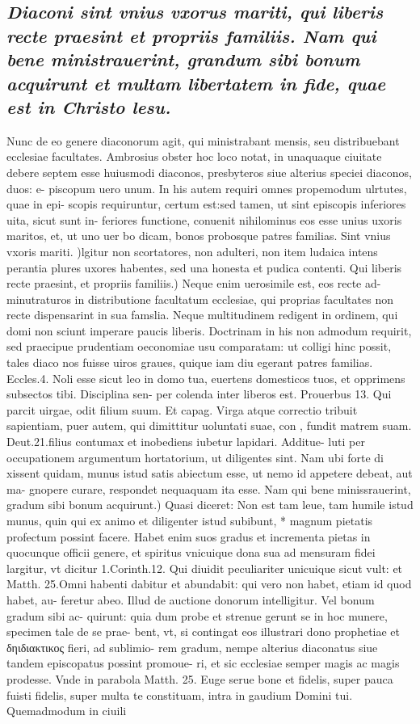 \documentclass{article}
\begin{document}
\begin{pages}
\subsection*{\textit{Diaconi sint vnius vxorus mariti, qui liberis recte praesint et propriis familiis. Nam qui bene ministrauerint, grandum sibi bonum acquirunt et multam libertatem in fide, quae est in Christo lesu. }}\pstart Nunc de eo genere diaconorum agit, qui ministrabant mensis, seu distribuebant ecclesiae facultates. Ambrosius obster hoc loco notat, in unaquaque ciuitate debere septem esse huiusmodi diaconos, presbyteros siue alterius speciei diaconos, duos: e- piscopum uero unum. In his autem requiri omnes propemodum ulrtutes, quae in epi- scopis requiruntur, certum est:sed tamen, ut sint episcopis inferiores uita, sicut sunt in- feriores functione, conuenit nihilominus eos esse unius uxoris maritos, et, ut uno uer bo dicam, bonos probosque patres familias.  \pend\pstart Sint vnius vxoris mariti. )lgitur non scortatores, non adulteri, non item ludaica intens perantia plures uxores habentes, sed una honesta et pudica contenti.  \pend\pstart Qui liberis recte praesint, et propriis familiis.) Neque enim uerosimile est, eos recte ad- minutraturos in distributione facultatum ecclesiae, qui proprias facultates non recte dispensarint in sua famslia. Neque multitudinem redigent in ordinem, qui domi non sciunt imperare paucis liberis. Doctrinam in his non admodum requirit, sed praecipue prudentiam oeconomiae usu comparatam: ut colligi hinc possit, tales diaco nos fuisse uiros graues, quique iam diu egerant patres familias. Eccles.4. Noli esse sicut leo in domo tua, euertens domesticos tuos, et opprimens subsectos tibi. Disciplina sen- per colenda inter liberos est. Prouerbus 13. Qui parcit uirgae, odit filium suum. Et capag. Virga atque correctio tribuit sapientiam, puer autem, qui dimittitur uoluntati suae, con , fundit matrem suam. Deut.21.filius contumax et inobediens iubetur lapidari. Additue- luti per occupationem argumentum hortatorium, ut diligentes sint. Nam ubi forte di xissent quidam, munus istud satis abiectum esse, ut nemo id appetere debeat, aut ma- gnopere curare, respondet nequaquam ita esse.  \pend\pstart Nam qui bene minissrauerint, gradum sibi bonum acquirunt.) Quasi diceret: Non  est tam leue, tam humile istud munus, quin qui ex animo et diligenter istud subibunt, * magnum pietatis profectum possint facere. Habet enim suos gradus et incrementa pietas in quocunque officii genere, et spiritus vnicuique dona sua ad mensuram fidei largitur, vt dicitur 1.Corinth.12. Qui diuidit peculiariter unicuique sicut vult: et Matth. 25.Omni habenti dabitur et abundabit: qui vero non habet, etiam id quod habet, au- feretur abeo. Illud de auctione donorum intelligitur. Vel bonum gradum sibi ac- quirunt: quia dum probe et strenue gerunt se in hoc munere, specimen tale de se prae- bent, vt, si contingat eos illustrari dono prophetiae et δηιδιακτικος fieri, ad sublimio- rem gradum, nempe alterius diaconatus siue tandem episcopatus possint promoue- ri, et sic ecclesiae semper magis ac magis prodesse. Vnde in parabola Matth. 25. Euge serue bone et fidelis, super pauca fuisti fidelis, super multa te constituam, intra in gaudium Domini tui. Quemadmodum in ciuili 
\end{pages}
\end{document}
